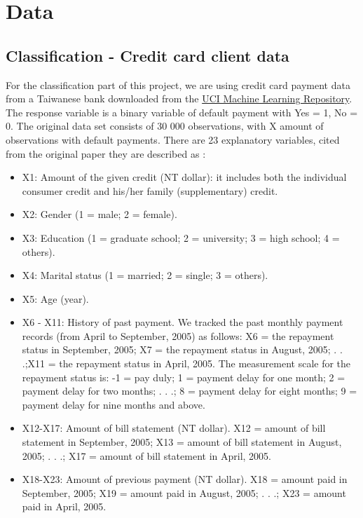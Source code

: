 \documentclass[a4paper, 11pt, twocolumn]{article}
\begin{document}
\section{Data}
\subsection{Classification - Credit card client data}
For the classification part of this project,  we are using credit card payment 
data from a Taiwanese bank downloaded from the \href{https://archive.ics.uci.edu/ml/datasets/default+of+credit+card+clients}{UCI Machine Learning Repository}. The 
response variable is a binary variable of default payment with Yes = 1, No = 0. 
The original data set consists of 30 000 observations, with X amount of 
observations with default payments. There are 23 explanatory variables, cited 
from the original paper they are described as \cite{origarticle}:
\begin{itemize}[leftmargin=5mm, itemsep=0pt,  parsep=1pt]
 \item X1: Amount of the given credit (NT dollar): it includes both the individual consumer credit and his/her family (supplementary) credit.
\item X2: Gender (1 = male; 2 = female).
\item X3: Education (1 = graduate school; 2 = university; 3 = high school; 4 = others).
\item X4: Marital status (1 = married; 2 = single; 3 = others).
\item X5: Age (year).
\item X6 - X11: History of past payment. We tracked the past monthly payment 
records (from April to September, 2005) as follows: X6 = the repayment status in 
September, 2005; X7 = the repayment status in August, 2005; . . .;X11 = the 
repayment status in April, 2005. The measurement scale for the repayment status 
is: -1 = pay duly; 1 = payment delay for one month; 2 = payment delay for two 
months; . . .; 8 = payment delay for eight months; 9 = payment delay for nine 
months and above.
\item X12-X17: Amount of bill statement (NT dollar). X12 = amount of bill 
statement in September, 2005; X13 = amount of bill statement in August, 2005; 
. . .; X17 = amount of bill statement in April, 2005.
\item X18-X23: Amount of previous payment (NT dollar). X18 = amount paid in 
September, 2005; X19 = amount paid in August, 2005; . . .; X23 = amount paid in 
April, 2005.
\end{itemize}
\end{document}
